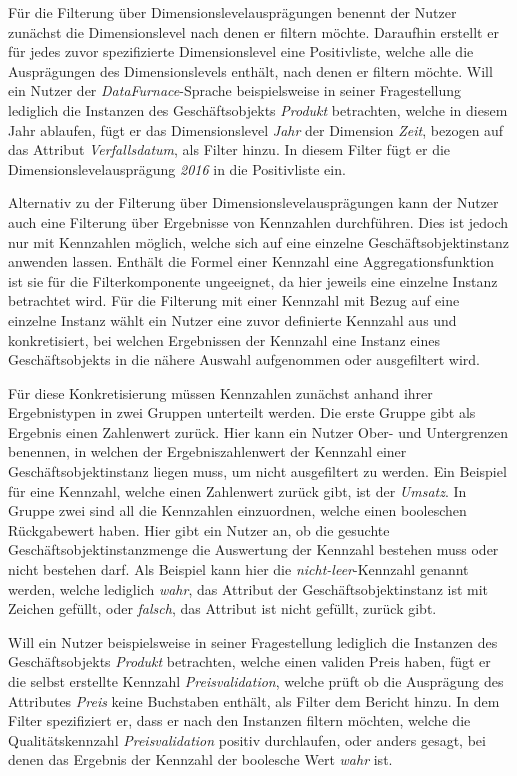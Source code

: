 \documentclass[
  language=german, %
  type=bachelor,%
  ngerman
]{isthesis}
\begin{document}
\begin{content}
  Für die Filterung über Dimensionslevelausprägungen benennt der Nutzer
  zunächst die Dimensionslevel nach denen er filtern möchte. Daraufhin erstellt
  er für jedes zuvor spezifizierte Dimensionslevel eine Positivliste, welche
  alle die Ausprägungen des Dimensionslevels enthält, nach denen er filtern
  möchte. Will ein Nutzer der \textit{DataFurnace}-Sprache beispielsweise in
  seiner Fragestellung lediglich die Instanzen des Geschäftsobjekts
  \textit{Produkt} betrachten, welche in diesem Jahr ablaufen, fügt er das
  Dimensionslevel \textit{Jahr} der Dimension \textit{Zeit}, bezogen auf das
  Attribut \textit{Verfallsdatum}, als Filter hinzu. In diesem Filter fügt er
  die Dimensionslevelausprägung \textit{2016} in die Positivliste ein.

	Alternativ zu der Filterung über Dimensionslevelausprägungen kann der Nutzer
	auch eine Filterung über Ergebnisse von Kennzahlen durchführen. Dies ist
	jedoch nur mit Kennzahlen möglich, welche sich auf eine einzelne
	Geschäftsobjektinstanz anwenden lassen. Enthält die Formel einer Kennzahl
	eine Aggregationsfunktion ist sie für die Filterkomponente ungeeignet, da
	hier jeweils eine einzelne Instanz betrachtet wird. Für die Filterung mit
	einer Kennzahl mit Bezug auf eine einzelne Instanz wählt ein Nutzer eine
	zuvor definierte Kennzahl aus und konkretisiert, bei welchen Ergebnissen der
	Kennzahl eine Instanz eines Geschäftsobjekts in die nähere Auswahl
	aufgenommen oder ausgefiltert wird.

  Für diese Konkretisierung müssen Kennzahlen zunächst anhand ihrer
  Ergebnistypen in zwei Gruppen unterteilt werden. Die erste Gruppe gibt als
  Ergebnis einen Zahlenwert zurück. Hier kann ein Nutzer Ober- und Untergrenzen
  benennen, in welchen der Ergebniszahlenwert der Kennzahl einer
  Geschäftsobjektinstanz liegen muss, um nicht ausgefiltert zu werden. Ein
  Beispiel für eine Kennzahl, welche einen Zahlenwert zurück gibt, ist der
  \textit{Umsatz}. In Gruppe zwei sind all die Kennzahlen einzuordnen, welche
  einen booleschen Rückgabewert haben. Hier gibt ein Nutzer an, ob die gesuchte
  Geschäftsobjektinstanzmenge die Auswertung der Kennzahl bestehen muss oder
  nicht bestehen darf. Als Beispiel kann hier die \textit{nicht-leer}-Kennzahl
  genannt werden, welche lediglich \textit{wahr}, das Attribut der
  Geschäftsobjektinstanz ist mit Zeichen gefüllt, oder \textit{falsch}, das
  Attribut ist nicht gefüllt, zurück gibt.

  Will ein Nutzer beispielsweise in seiner Fragestellung lediglich die
  Instanzen des Geschäftsobjekts \textit{Produkt} betrachten, welche einen
  validen Preis haben, fügt er die selbst erstellte Kennzahl
  \textit{Preisvalidation}, welche prüft ob die Ausprägung des Attributes
  \textit{Preis} keine Buchstaben enthält, als Filter dem Bericht hinzu. In dem
  Filter spezifiziert er, dass er nach den Instanzen filtern möchten, welche
  die Qualitätskennzahl \textit{Preisvalidation} positiv durchlaufen, oder
  anders gesagt, bei denen das Ergebnis der Kennzahl der boolesche Wert
  \textit{wahr} ist.


\end{content}
\end{document}
